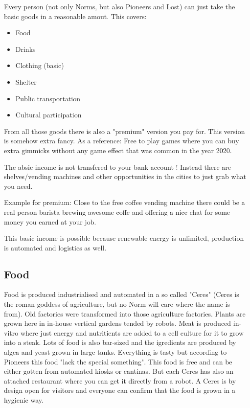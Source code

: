 Every person (not only Norms, but also Pioneers and Lost) can just take the basic goods in a reasonable amout. This covers:

\begin{itemize}
    \item Food
    \item Drinks
    \item Clothing (basic)
    \item Shelter
    \item Public transportation
    \item Cultural participation
\end{itemize}

From all those goods there is also a "premium" version you pay for. This version is somehow extra fancy. As a reference: Free to play games where you can buy extra gimmicks without any game effect that was common in the year 2020.

The absic income is not transfered to your bank account ! Instead there are shelves/vending machines and other opportunities in the cities to just grab what you need.

Example for premium: Close to the free coffee vending machine there could be a real person barista brewing awesome coffe and offering a nice chat for some money you earned at your job.

This basic income is possible because renewable energy is unlimited, production is automated and logistics as well.

\subsection{Food}
\label{sec: norm food}

Food is produced industrialised and automated in a so called "Ceres" (Ceres is the roman goddess of agriculture, but no Norm will care where the name is from). Old factories were transformed into those agriculture factories. Plants are grown here in in-house vertical gardens tended by robots. Meat is produced in-vitro where just energy and nutritients are added to a cell culture for it to grow into a steak. Lots of food is also bar-sized and the igredients are produced by algea and yeast grown in large tanks.
Everything is tasty but according to Pioneers this food "lack the special something".
This food is free and can be either gotten from automated kiosks or cantinas. But each Ceres has also an attached restaurant where you can get it directly from a robot. A Ceres is by design open for visitors and everyone can confirm that the food is grown in a hygienic way.

